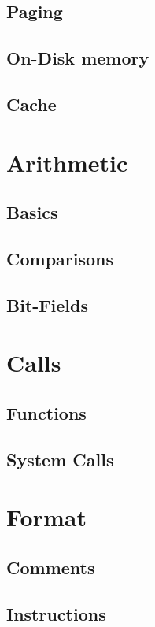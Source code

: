 \documentclass{scrartcl}
\begin{document}
        \subsection{Paging}
        \subsection{On-Disk memory}
        \subsection{Cache}
    \section{Arithmetic}
        \subsection{Basics}
        \subsection{Comparisons}
        \subsection{Bit-Fields}
    \section{Calls}
        \subsection{Functions}
        \subsection{System Calls}
    \section{Format}
        \subsection{Comments}
        \subsection{Instructions}
\end{document}
